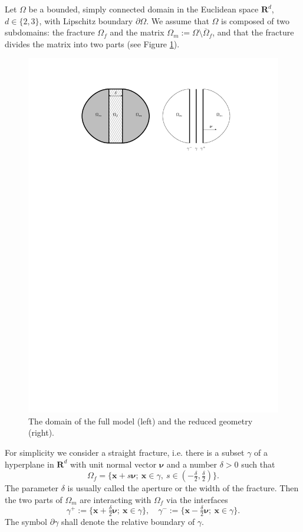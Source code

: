 \documentclass[a4paper]{article}
\numberwithin{equation}{section}
\def\nnu{\boldsymbol\nu}
\def\prtl{\partial}
\def\Real{{\mathbf R}} %
\def\vc#1{\mathbf{#1}}     %
\def\xx{\vc x}
\newcommand{\eqs}[1]{\begin{equation*}#1\end{equation*}}
\begin{document}
Let $\Omega$ be a bounded, simply connected domain in the Euclidean space $\Real^d$, $d\in\{2,3\}$, with Lipschitz boundary $\partial\Omega$.
We assume that $\Omega$ is composed of two subdomains: the fracture $\Omega_f$ and the matrix $\Omega_m:=\Omega\setminus\overline\Omega_f$, and that the fracture divides the matrix into two parts (see Figure \ref{fig:omegas}).
\begin{figure}[h]
\centering
\includegraphics[width=\textwidth]{figures/omegas}
\caption{The domain of the full model (left) and the reduced geometry (right).}
\label{fig:omegas}
\end{figure}
For simplicity we consider a straight fracture, i.e. there is a subset $\gamma$ of a hyperplane in $\Real^d$ with unit normal vector $\nnu$ and a number $\delta>0$ such that
\eqs{ \Omega_f = \{\xx+s\nnu;~\xx\in\gamma,~s\in(-\tfrac\delta2,\tfrac\delta2)\}. }
The parameter $\delta$ is usually called the aperture or the width of the fracture.
Then the two parts of $\Omega_m$ are interacting with $\Omega_f$ via the interfaces
\eqs{ \gamma^+ := \{\xx+\tfrac\delta2\nnu;~\xx\in\gamma\},\quad \gamma^- := \{\xx-\tfrac\delta2\nnu;~\xx\in\gamma\}. }
The symbol $\prtl\gamma$ shall denote the relative boundary of $\gamma$.
\end{document}
